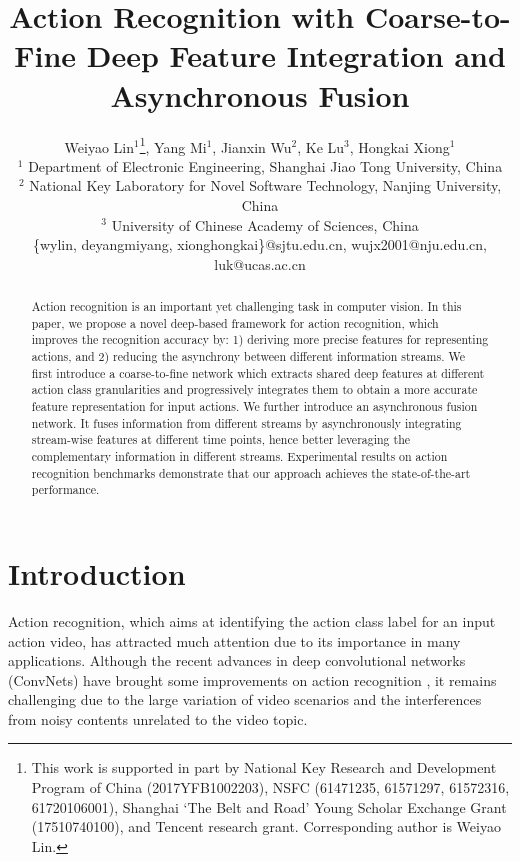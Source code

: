 \documentclass[letterpaper]{article}
\begin{document}
\title{Action Recognition with Coarse-to-Fine Deep Feature Integration and Asynchronous Fusion}
\author{Weiyao Lin$^1$\thanks{This work is supported in part by National Key Research and Development Program of China (2017YFB1002203), NSFC (61471235, 61571297, 61572316, 61720106001), Shanghai `The Belt and Road' Young Scholar Exchange Grant (17510740100), and Tencent research grant. Corresponding author is Weiyao Lin.}, Yang Mi$^1$, Jianxin Wu$^2$, Ke Lu$^3$, Hongkai Xiong$^1$\\
 $^1$ Department of Electronic Engineering, Shanghai Jiao Tong University, China\\
 $^2$ National Key Laboratory for Novel Software Technology, Nanjing University, China \\
 $^3$ University of Chinese Academy of Sciences, China \\
 \{wylin, deyangmiyang, xionghongkai\}@sjtu.edu.cn, wujx2001@nju.edu.cn, luk@ucas.ac.cn
 }

\maketitle

\begin{abstract}
  Action recognition is an important yet challenging task in computer vision. In this paper, we propose a novel deep-based framework for action recognition, which improves the recognition accuracy by: 1) deriving more precise features for representing actions, and 2) reducing the asynchrony between different information streams. We first introduce a coarse-to-fine network which extracts shared deep features at different action class granularities and progressively integrates them to obtain a more accurate feature representation for input actions. We further introduce an asynchronous fusion network. It fuses information from different streams by asynchronously integrating stream-wise features at different time points, hence better leveraging the complementary information in different streams. Experimental results on action recognition benchmarks demonstrate that our approach achieves the state-of-the-art performance.
\end{abstract}

\section{Introduction\label{section:introduction}}

Action recognition, which aims at identifying the action class label for an input action video, has attracted much attention due to its importance in many applications. Although the recent advances in deep convolutional networks (ConvNets) have brought some improvements on action recognition \cite{c3d,KVMF}, it remains challenging due to the large variation of video scenarios and the interferences from noisy contents unrelated to the video topic.
\end{document}
